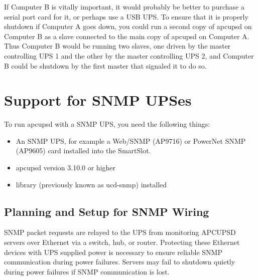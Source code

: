 {{{{{{{If Computer B is vitally important, it would probably be better to purchase a
serial port card for it, or perhaps use a USB UPS. To ensure that it is
properly shutdown if Computer A goes down, you could run a second copy of
apcupsd on Computer B as a slave connected to the main copy of apcupsd on
Computer A. Thus Computer B would be running two slaves, one driven by the
master controlling UPS 1 and the other by the master controlling UPS 2, and
Computer B could be shutdown by the first master that signaled it to do so. 

\label{Support-for-SNMP-UPSes}

\section*{Support for SNMP UPSes}

\label{index-SNMP-162}
To run apcupsd with a SNMP UPS, you need the following things:  

\begin{itemize}
\item An SNMP UPS, for example a Web/SNMP (AP9716) or PowerNet SNMP (AP9605)
card installed into the SmartSlot.  
\item apcupsd version 3.10.0 or higher  
\item 
    library (previously known as
   ucd-snmp) installed 
\end{itemize}

\label{Planning-SNMP-Setup-Wiring}

\subsection*{Planning and Setup for SNMP Wiring}

\label{index-SNMP_002d-Wiring-163}
SNMP packet requests are relayed to the UPS from monitoring APCUPSD servers over
Ethernet via a switch, hub, or router.  Protecting these Ethernet devices
with UPS supplied power is necessary to ensure reliable SNMP communication
during power failures.   Servers may fail to shutdown quietly during power failures
if SNMP communication is lost.

\label{Planning-SNMP-Setup-Configuration}

}}}}}}}
